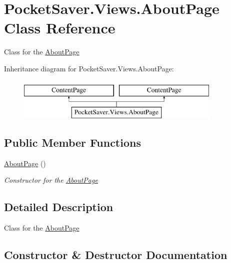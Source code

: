 \hypertarget{class_pocket_saver_1_1_views_1_1_about_page}{}\section{Pocket\+Saver.\+Views.\+About\+Page Class Reference}
\label{class_pocket_saver_1_1_views_1_1_about_page}


Class for the \hyperlink{class_pocket_saver_1_1_views_1_1_about_page}{About\+Page}  


Inheritance diagram for Pocket\+Saver.\+Views.\+About\+Page\+:\begin{figure}[H]
\begin{center}
\leavevmode
\includegraphics[height=2.000000cm]{class_pocket_saver_1_1_views_1_1_about_page}
\end{center}
\end{figure}
\subsection*{Public Member Functions}
\begin{DoxyCompactItemize}
\item 
\hyperlink{class_pocket_saver_1_1_views_1_1_about_page_af59ade4fd20fb646983154e0dbfd2f92}{About\+Page} ()
\begin{DoxyCompactList}\small\item\em Constructor for the \hyperlink{class_pocket_saver_1_1_views_1_1_about_page}{About\+Page} \end{DoxyCompactList}\end{DoxyCompactItemize}


\subsection{Detailed Description}
Class for the \hyperlink{class_pocket_saver_1_1_views_1_1_about_page}{About\+Page} 



\subsection{Constructor \& Destructor Documentation}
\mbox{\label{class_pocket_saver_1_1_views_1_1_about_page_af59ade4fd20fb646983154e0dbfd2f92}} 
